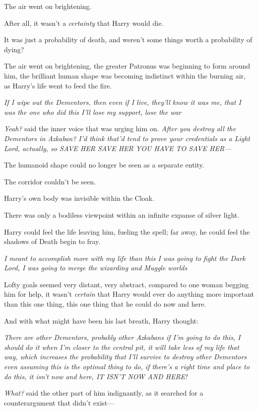 The air went on brightening.

After all, it wasn't a \emph{certainty} that Harry would die.

It was just a probability of death, and weren't some things worth a probability
of dying?

The air went on brightening, the greater Patronus was beginning to form around
him, the brilliant human shape was becoming indistinct within the burning air,
as Harry's life went to feed the fire.

\emph{If I wipe out the Dementors, then even if I live, they'll know it was me,
that I was the one who did this{\el} I'll lose my support, lose the
war{\el}}

\emph{Yeah?} said the inner voice that was urging him on. \emph{After you
destroy all the Dementors in Azkaban? I'd think that'd tend to prove your
credentials as a Light Lord, actually, so SAVE HER SAVE HER YOU HAVE TO SAVE
HER---}

The humanoid shape could no longer be seen as a separate entity.

The corridor couldn't be seen.

Harry's own body was invisible within the Cloak.

There was only a bodiless viewpoint within an infinite expanse of silver light.

Harry could feel the life leaving him, fueling the spell; far away, he could
feel the shadows of Death begin to fray.

\emph{I meant to accomplish more with my life than this{\el} I was going to
fight the Dark Lord, I was going to merge the wizarding and Muggle
worlds{\el}}

Lofty goals seemed very distant, very abstract, compared to one woman begging
him for help, it wasn't \emph{certain} that Harry would ever do anything more
important than this one thing, this one thing that he could do now and here.

And with what might have been his last breath, Harry thought:

\emph{There are other Dementors, probably other Azkabans{\el} if I'm going
to do this, I should do it when I'm closer to the central pit, it will take
less of my life that way, which increases the probability that I'll survive to
destroy other Dementors{\el} even assuming this is the optimal thing to do,
if there's a right time and place to do this, it isn't now and here, IT ISN'T
NOW AND HERE!}

\emph{What?} said the other part of him indignantly, as it searched for a
counterargument that didn't exist---

